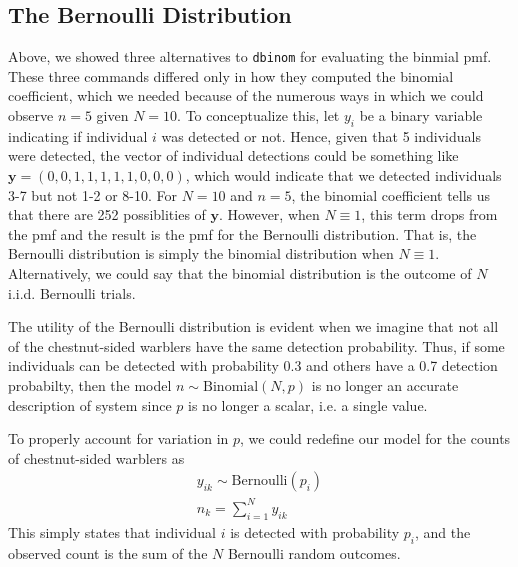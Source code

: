 \subsection{The Bernoulli Distribution}


Above, we showed three alternatives to \verb+dbinom+ for evaluating the
binmial pmf. These three commands differed only in how they computed
the binomial coefficient, which we needed because of the numerous ways
in which we could observe $n=5$ given $N=10$. To conceptualize
this, let $y_i$ be a binary variable indicating if individual $i$
was detected or not. Hence, given that 5 individuals were detected,
the vector of individual detections could be something like
$\mathbf{y}=(0,0,1,1,1,1,1,0,0,0)$, which would indicate
that we detected individuals 3-7 but not 1-2 or 8-10. For $N=10$ and
$n=5$, the binomial coefficient tells us that there
are 252 possiblities of $\mathbf{y}$. However, when $N \equiv 1$, this term
drops from the pmf and the result is the pmf for the Bernoulli
distribution. That is, the Bernoulli distribution is simply the
binomial distribution when $N \equiv 1$. Alternatively, we could say that the binomial
distribution is the outcome of $N$ i.i.d. Bernoulli trials.

The utility of the Bernoulli distribution is evident when we imagine
that not all of the chestnut-sided warblers have the same detection
probability. Thus, if some individuals can be detected with
probability 0.3 and others have a 0.7 detection probabilty, then the
model $n \sim \text{Binomial}(N, p)$ is no longer an accurate
description of system since $p$ is no
longer a scalar, i.e. a single value.


To properly account for variation in $p$, we could redefine our model
for the %
counts of chestnut-sided warblers as
\begin{gather}
y_{ik} \sim \text{Bernoulli}(p_i) \nonumber \\%
n_k = \sum_{i=1}^N y_{ik}
\label{modeling.eq.Bern}
\end{gather}
This simply states that individual $i$ is detected with probability
$p_i$, and the observed count is the sum of the $N$ Bernoulli random
outcomes.

